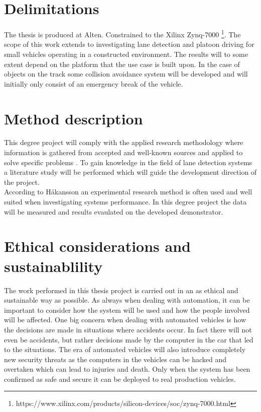 \section{Delimitations}
The thesis is produced at Alten. Constrained to the Xilinx Zynq-7000 \footnote{https://www.xilinx.com/products/silicon-devices/soc/zynq-7000.html}. The scope of this work extends to investigating lane detection and platoon driving for small vehicles operating in a constructed environment. The results will to some extent depend on the platform that the use case is built upon. In the case of objects on the track some collision avoidance system will be developed and will initially only consist of an emergency break of the vehicle.

\section{Method description}
This degree project will comply with the applied research methodology where information is gathered from accepted and well-known sources and applied to solve specific problems \cite{haakansson2013portal}. To gain knowledge in the field of lane detection systems a literature study will be performed which will guide the development direction of the project.\\

According to Håkansson \cite{haakansson2013portal} an experimental research method is often used and well suited when investigating systems performance. In this degree project the data will be measured and results evaulated on the developed demonstrator.


\section{Ethical considerations and sustainablility}
The work performed in this thesis project is carried out in an as ethical and sustainable way as possible. As always when dealing with automation, it can be important to consider how the system will be used and how the people involved will be affected. One big concern when dealing with automated vehicles is how the decisions are made in situations where accidents occur. In fact there will not even be accidents, but rather decisions made by the computer in the car that led to the situations. The era of automated vehicles will also introduce completely new security threats as the computers in the vehicles can be hacked and overtaken which can lead to injuries and death. Only when the system has been confirmed as safe and secure it can be deployed to real production vehicles.